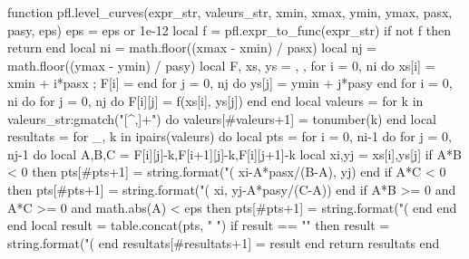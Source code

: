 \begin{luacode*}
function pfl.level_curves(expr_str, valeurs_str, xmin, xmax, ymin, ymax, pasx, pasy, eps)
    eps = eps or 1e-12
    local f = pfl.expr_to_func(expr_str)
    if not f then return {} end
    local ni = math.floor((xmax - xmin) / pasx)
    local nj = math.floor((ymax - ymin) / pasy)
    local F, xs, ys = {}, {}, {}
    for i = 0, ni do xs[i] = xmin + i*pasx ; F[i] = {} end
    for j = 0, nj do ys[j] = ymin + j*pasy end
    for i = 0, ni do
        for j = 0, nj do F[i][j] = f(xs[i], ys[j]) end
    end
    local valeurs = {}
    for k in valeurs_str:gmatch("[^,]+") do
        valeurs[#valeurs+1] = tonumber(k)
    end
    local resultats = {}
    for _, k in ipairs(valeurs) do
        local pts = {}
        for i = 0, ni-1 do
            for j = 0, nj-1 do
                local A,B,C = F[i][j]-k,F[i+1][j]-k,F[i][j+1]-k
                local xi,yj = xs[i],ys[j]
                if A*B < 0 then
                    pts[#pts+1] = string.format("(%
                        xi-A*pasx/(B-A), yj)
                end
                if A*C < 0 then
                    pts[#pts+1] = string.format("(%
                        xi, yj-A*pasy/(C-A))
                end
                if A*B >= 0 and A*C >= 0 and math.abs(A) < eps then
                    pts[#pts+1] = string.format("(%
                end
            end
        end
        local result = table.concat(pts, " ")
        if result == "" then
            result = string.format("(%
        end
        resultats[#resultats+1] = result
    end
    return resultats
end
\end{luacode*}
\fi

\endinput